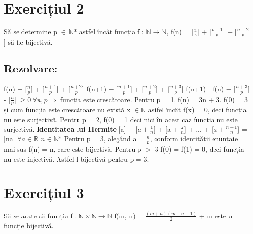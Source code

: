 \documentclass{article}
\begin{document}
\section{Exercițiul 2}
Să se determine p $\in \, \mathbb{N}$* astfel încât funcția f : $\mathbb{N} \rightarrow \mathbb{N}$, f(n) = [$\frac{n}{p}$] + [$\frac{n+1}{p}$] + [$\frac{n+2}{p}$] să fie bijectivă.

\subsection{Rezolvare:}
f(n) = [$\frac{n}{p}$] + [$\frac{n+1}{p}$] + [$\frac{n+2}{p}$]
\newline
f(n+1) = [$\frac{n+1}{p}$] + [$\frac{n+2}{p}$] + [$\frac{n+3}{p}$]
\newline
f(n+1) - f(n) = [$\frac{n+3}{p}$] -  [$\frac{n}{p}$] $\geq 0 \ \forall n, p \Rightarrow$ funcția este crescătoare. 
\newline
Pentru p = 1, f(n) = 3n + 3. f(0) = 3 și cum funcția este crescătoare nu există x $\in \mathbb{N}$ astfel încât f(x) = 0, deci funcția nu este surjectivă.
\newline
Pentru p = 2, f(0) = 1 deci nici în acest caz funcția nu este surjectivă.
\newline
\textbf{Identitatea lui Hermite}
[a] + [$a + \frac{1}{n}$] + [a + $\frac{2}{n}$] + ... +  [$ a + \frac{n-1}{n}$] = [na] $\forall a \in \mathbb{R}, n \in \mathbb{N}$*
\newline
Pentru p = 3, alegând a = $\frac{n}{p}$, conform identității enunțate mai sus f(n) = n, care este bijectivă.
\newline
Pentru p $>$ 3 f(0) = f(1) = 0, deci funcția nu este injectivă.
\newline
Astfel f bijectivă pentru p = 3.

\section{Exercițiul 3}
Să se arate că funcția f : $\mathbb{N} \times  \mathbb{N} \rightarrow \mathbb{N}$ f(m, n) = $\frac{(m+n)(m+n+1)}{2}$ + m este o funcție bijectivă.
\end{document}
